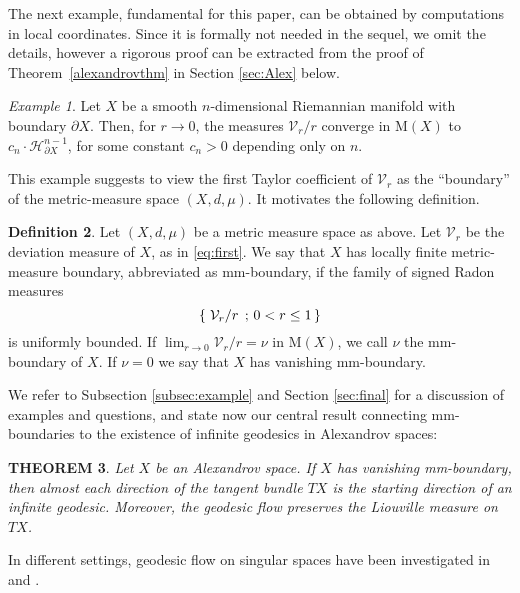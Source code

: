 \documentclass[12pt,leqno,intlimits]{amsart}
\numberwithin{equation}{section}
\newtheorem{thm}{THEOREM}[section]
\theoremstyle{definition}
\newtheorem{defn}[thm]{Definition}%
\theoremstyle{remark}
\newtheorem{ex}[thm]{Example}
\newcommand{\tref}[1]{Theorem~\ref{#1}}
\newcommand*{\set}[2]{\left\{\,\left.{#1}\vphantom{#2}\,\right.;\,{#2}\,\right\}}
\begin{document}
The next example, fundamental for this paper,  can be obtained by computations in local coordinates.
Since it is formally not needed in the sequel, we omit
the details, however  a rigorous  proof can be extracted from the proof of \tref{alexandrovthm} in Section \ref{sec:Alex} below.


\begin{ex} \label{mainex}
Let $X$ be a smooth $n$-dimensional Riemannian manifold with boundary $\partial X$.
Then, for $r\to 0$, the measures $\mathcal{V}_r/r$ converge in $\mathrm M(X)$ to
$c_n \cdot \mathcal H^{n-1} _{\partial X}$, for some constant $c_n >0$ depending only on $n$.
\end{ex}

This example suggests to view the first Taylor coefficient of $\mathcal{V}_r$ as the ``boundary'' of the metric-measure space $(X, d, \mu)$.
It motivates the following definition.

\begin{defn} \label{def:first}
Let $(X,d,\mu)$ be a metric measure space as above. Let $\mathcal{V}_r$ be the deviation measure of $X$, as in \eqref{eq:first}.
We say that $X$ has locally finite metric-measure boundary, abbreviated as mm-boundary,
if the family of signed Radon measures
\[\set{\mathcal{V}_r/r }{0<r\leq 1}\]
is uniformly bounded.
If $\lim _{r\to 0} \mathcal{V}_r /r =\nu $ in $\mathrm M(X)$, we call $\nu$ the mm-boundary of $X$. If $\nu =0$ we say that $X$ has vanishing mm-boundary.
\end{defn}

We refer to Subsection \ref{subsec:example} and Section \ref{sec:final} for a discussion of examples and questions, and
state now our central result connecting mm-boundaries to the existence of infinite geodesics in Alexandrov spaces:

\begin{thm} \label{thmmain}
Let $X$ be an Alexandrov space.
If $X$ has vanishing mm-boundary, then almost each direction of the tangent
bundle $TX$ is the starting direction of an infinite geodesic.
Moreover, the geodesic flow preserves the Liouville measure on $TX$.
\end{thm}

In different settings, geodesic flow on singular spaces have been investigated in \cite{BallmannBrin} and \cite{Bamler}.
\end{document}
